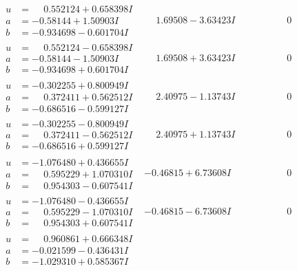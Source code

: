 \documentclass[1p]{elsarticle_modified}
\theoremstyle{definition}
\begin{document}
$$\begin{array}{c|c|c}
\begin{aligned}
u &= \phantom{-}0.552124 + 0.658398 I \\
a &= -0.58144 + 1.50903 I \\
b &= -0.934698 - 0.601704 I\end{aligned}
 & \phantom{-}1.69508 - 3.63423 I & \phantom{-0.000000 } 0 \\ \hline\begin{aligned}
u &= \phantom{-}0.552124 - 0.658398 I \\
a &= -0.58144 - 1.50903 I \\
b &= -0.934698 + 0.601704 I\end{aligned}
 & \phantom{-}1.69508 + 3.63423 I & \phantom{-0.000000 } 0 \\ \hline\begin{aligned}
u &= -0.302255 + 0.800949 I \\
a &= \phantom{-}0.372411 + 0.562512 I \\
b &= -0.686516 - 0.599127 I\end{aligned}
 & \phantom{-}2.40975 - 1.13743 I & \phantom{-0.000000 } 0 \\ \hline\begin{aligned}
u &= -0.302255 - 0.800949 I \\
a &= \phantom{-}0.372411 - 0.562512 I \\
b &= -0.686516 + 0.599127 I\end{aligned}
 & \phantom{-}2.40975 + 1.13743 I & \phantom{-0.000000 } 0 \\ \hline\begin{aligned}
u &= -1.076480 + 0.436655 I \\
a &= \phantom{-}0.595229 + 1.070310 I \\
b &= \phantom{-}0.954303 - 0.607541 I\end{aligned}
 & -0.46815 + 6.73608 I & \phantom{-0.000000 } 0 \\ \hline\begin{aligned}
u &= -1.076480 - 0.436655 I \\
a &= \phantom{-}0.595229 - 1.070310 I \\
b &= \phantom{-}0.954303 + 0.607541 I\end{aligned}
 & -0.46815 - 6.73608 I & \phantom{-0.000000 } 0 \\ \hline\begin{aligned}
u &= \phantom{-}0.960861 + 0.666348 I \\
a &= -0.021599 - 0.436431 I \\
b &= -1.029310 + 0.585367 I\end{aligned}

\end{array}$$
\end{document}
